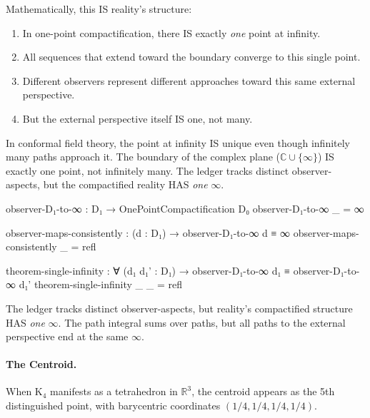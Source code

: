 \documentclass[11pt,a4paper]{book}
\begin{document}
Mathematically, this IS reality's structure:
\begin{enumerate}
\item In one-point compactification, there IS exactly \emph{one} point at infinity.
\item All sequences that extend toward the boundary converge to this single point.
\item Different observers represent different approaches toward this same external perspective.
\item But the external perspective itself IS one, not many.
\end{enumerate}

In conformal field theory, the point at infinity IS unique even though infinitely 
many paths approach it. The boundary of the complex plane ($\mathbb{C} \cup \{\infty\}$) 
IS exactly one point, not infinitely many. The ledger tracks distinct observer-aspects, 
but the compactified reality HAS \emph{one} $\infty$.

\begin{code}
observer-D₁-to-∞ : D₁ → OnePointCompactification D₀
observer-D₁-to-∞ _ = ∞

observer-maps-consistently : (d : D₁) → observer-D₁-to-∞ d ≡ ∞
observer-maps-consistently _ = refl

theorem-single-infinity : ∀ (d₁ d₁' : D₁) → observer-D₁-to-∞ d₁ ≡ observer-D₁-to-∞ d₁'
theorem-single-infinity _ _ = refl
\end{code}

The ledger tracks distinct observer-aspects, but reality's compactified structure 
HAS \emph{one} $\infty$. The path integral sums over paths, but all paths to the 
external perspective end at the same $\infty$.

\paragraph{The Centroid.}
When K$_4$ manifests as a tetrahedron in $\mathbb{R}^3$, the centroid appears as 
the 5th distinguished point, with barycentric coordinates $(1/4, 1/4, 1/4, 1/4)$.
\end{document}
